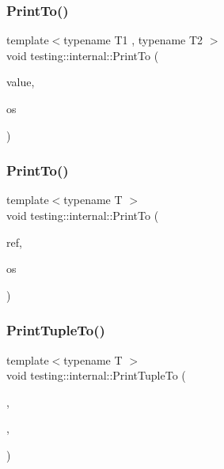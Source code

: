 \mbox{\label{namespacetesting_1_1internal_af2c33928facbf2edf7af564278724d98}} 
\subsubsection{\texorpdfstring{PrintTo()}{PrintTo()}\hspace{0.1cm}{\footnotesize\ttfamily [22/23]}}
{\footnotesize\ttfamily template$<$typename T1 , typename T2 $>$ \\
void testing\+::internal\+::\+Print\+To (\begin{DoxyParamCaption}\item[{const \+::std\+::pair$<$ T1, T2 $>$ \&}]{value,  }\item[{\+::std\+::ostream $\ast$}]{os }\end{DoxyParamCaption})}

\mbox{\label{namespacetesting_1_1internal_a8fd10cc30084c36a89c74868c8bd53f8}} 
\subsubsection{\texorpdfstring{PrintTo()}{PrintTo()}\hspace{0.1cm}{\footnotesize\ttfamily [23/23]}}
{\footnotesize\ttfamily template$<$typename T $>$ \\
void testing\+::internal\+::\+Print\+To (\begin{DoxyParamCaption}\item[{const \mbox{\hyperlink{classtesting_1_1internal_1_1_reference_wrapper}{Reference\+Wrapper}}$<$ T $>$ \&}]{ref,  }\item[{\+::std\+::ostream $\ast$}]{os }\end{DoxyParamCaption})}

\mbox{\label{namespacetesting_1_1internal_a7174fbf5d6ba458afae675022c9aae1e}} 
\subsubsection{\texorpdfstring{PrintTupleTo()}{PrintTupleTo()}\hspace{0.1cm}{\footnotesize\ttfamily [1/2]}}
{\footnotesize\ttfamily template$<$typename T $>$ \\
void testing\+::internal\+::\+Print\+Tuple\+To (\begin{DoxyParamCaption}\item[{const T \&}]{,  }\item[{std\+::integral\+\_\+constant$<$ size\+\_\+t, 0 $>$}]{,  }\item[{\+::std\+::ostream $\ast$}]{ }\end{DoxyParamCaption})}


